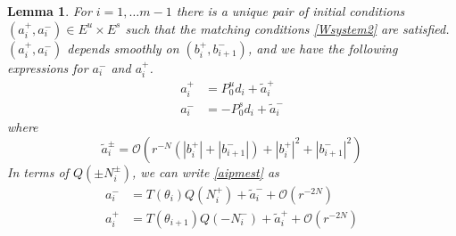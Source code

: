 \documentclass[12pt]{article}
\newtheorem{lemma}{Lemma}
\begin{document}
\begin{lemma}\label{inv2}
For $i = 1, \dots m-1$ there is a unique pair of initial conditions $(a_i^+, a_i^-) \in E^u \times E^s$ such that the matching conditions \eqref{Wsystem2} are satisfied. $(a_i^+, a_i^-)$ depends smoothly on $(b_i^+, b_{i+1}^-)$, and we have the following expressions for $a_i^-$ and $a_i^+$. 
\begin{equation}\label{aipmest}
\begin{aligned}
a_i^+ &= P_0^u d_i + \tilde{a}_i^+ \\
a_i^- &= -P_0^s d_i + \tilde{a}_i^-
\end{aligned}
\end{equation}
where 
\begin{equation}\label{tildeaest}
\tilde{a}_i^\pm = \mathcal{O}(r^{-N}(|b_i^+|+|b_{i+1}^-|) + |b_i^+|^2+|b_{i+1}^-|^2) 
\end{equation}
In terms of $Q(\pm N_i^\pm)$, we can write \eqref{aipmest} as 
\begin{equation}\label{aipmexp}
\begin{aligned}
a_i^- &= T(\theta_i) Q(N_i^+) + \tilde{a}_i^- + \mathcal{O}(r^{-2N}) \\
a_i^+ &= T(\theta_{i+1}) Q(-N_i^-) + \tilde{a}_i^+ + \mathcal{O}(r^{-2N}) \\
\end{aligned}
\end{equation}


\end{lemma}
\end{document}
